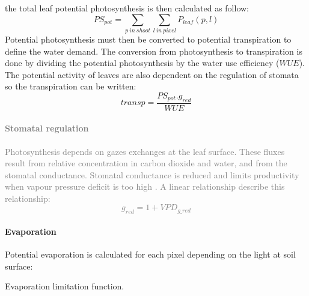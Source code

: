 \documentclass[a4paper,twoside, justified,marginals=raggedright, nobib]{tufte-handout}
\begin{document}
the total leaf potential photosynthesis is then calculated as follow:
\begin{equation}\label{eq:PS_pot}
PS_{pot} = \sum_{p\ in\ shoot}\sum_{l\ in\ pixel}P_{leaf}(p,l)
\end{equation}
\indent Potential photosynthesis must then be converted to potential transpiration to define the water demand. The conversion from photosynthesis to transpiration is done by dividing the potential photosynthesis by the water use efficiency ($WUE$). The potential activity of leaves are also dependent on the regulation of stomata so the transpiration can be written:
\begin{equation}
transp = \frac{PS_{pot} . g_{red}}{WUE}
\end{equation}

\textcolor{Gray}{\paragraph{Stomatal regulation} Photosynthesis depends on gazes exchanges at the leaf surface. These fluxes result from relative concentration in carbon dioxide and water, and from the stomatal conductance. Stomatal conductance is reduced and limits productivity when vapour pressure deficit is too high . A linear relationship describe this relationship:
\begin{equation}
g_{red} = 1+ VPD_{g\_red}
\end{equation}}

\paragraph{Evaporation} Potential evaporation is calculated for each pixel depending on the light at soil surface:

\begin{marginfigure}
\label{fig:derivaives}
\caption{Evaporation  limitation function.}
\end{marginfigure}
\end{document}
